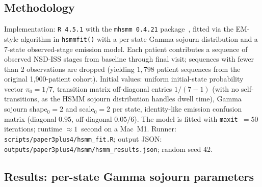 \documentclass[11pt]{article}
\begin{document}
\subsection*{Methodology}

Implementation: \texttt{R 4.5.1} with the \texttt{mhsmm 0.4.21} package~\cite{omalley2015mhsmm}, fitted via the EM-style algorithm in \texttt{hsmmfit()} with a per-state Gamma sojourn distribution and a 7-state observed-stage emission model. Each patient contributes a sequence of observed NSD-ISS stages from baseline through final visit; sequences with fewer than 2 observations are dropped (yielding $1{,}798$ patient sequences from the original 1{,}900-patient cohort). Initial values: uniform initial-state probability vector $\pi_0 = 1/7$, transition matrix off-diagonal entries $1/(7-1)$ (with no self-transitions, as the HSMM sojourn distribution handles dwell time), Gamma sojourn shape$_0 = 2$ and scale$_0 = 2$ per state, identity-like emission confusion matrix (diagonal $0.95$, off-diagonal $0.05/6$). The model is fitted with \texttt{maxit~$=50$} iterations; runtime $\approx 1$~second on a Mac~M1. Runner: \texttt{scripts/paper3plus4/hsmm\_fit.R}; output JSON: \texttt{outputs/paper3plus4/hsmm/hsmm\_results.json}; random seed 42.

\subsection*{Results: per-state Gamma sojourn parameters}
\end{document}
